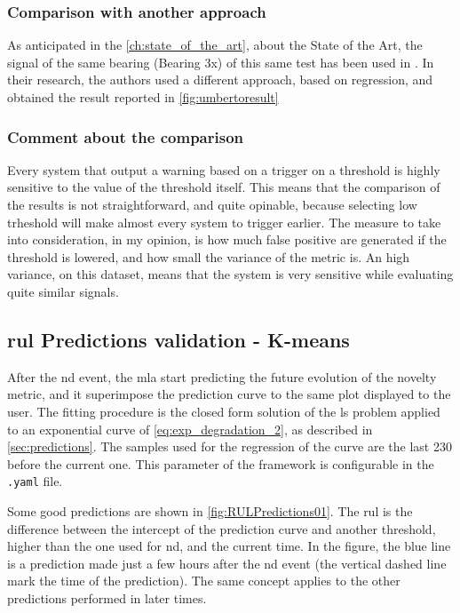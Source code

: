 \subsubsection{Comparison with another approach}
As anticipated in the \autoref{ch:state_of_the_art}, about the State of the Art, the signal of the same bearing (Bearing 3x) of this same test has been used in \cite{Umberto}. In their research, the authors used a different approach, based on regression, and obtained the result reported in \autoref{fig:umbertoresult}


\subsubsection{Comment about the comparison}
Every system that output a warning based on a trigger on a threshold is highly sensitive to the value of the threshold itself. This means that the comparison of the results is not straightforward, and quite opinable, because selecting low trheshold will make almost every system to trigger earlier. The measure to take into consideration, in my opinion, is how much false positive are generated if the threshold is lowered, and how small the variance of the metric is. An high variance, on this dataset, means that the system is very sensitive while evaluating quite similar signals.

\subsection{\gls{rul} Predictions validation - K-means}
After the \gls{nd} event, the \gls{mla} start predicting the future evolution of the novelty metric, and it superimpose the prediction curve to the same plot displayed to the user. The fitting procedure is the closed form solution of the \gls{ls} problem applied to an exponential curve of \autoref{eq:exp_degradation_2}, as described in \autoref{sec:predictions}. The samples used for the regression of the curve are the last 230 before the current one. This parameter of the framework is configurable in the \texttt{.yaml} file. 

Some good predictions are shown in \autoref{fig:RULPredictions01}. The \gls{rul} is the difference between the intercept of the prediction curve and another threshold, higher than the one used for \gls{nd}, and the current time. In the figure, the blue line is a prediction made just a few hours after the \gls{nd} event (the vertical dashed line mark the time of the prediction). The same concept applies to the other predictions performed in later times.

